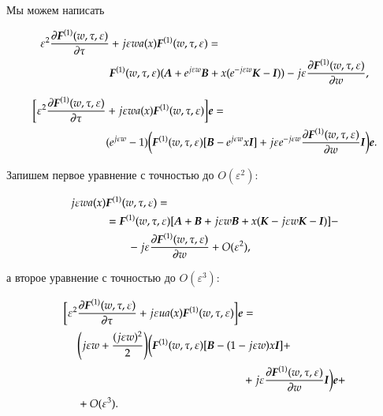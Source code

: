 Мы можем написать 

\begin{align*}
	\varepsilon ^2 \pdv{\boldsymbol{F}^{(1)}(w, \tau , \varepsilon)}{\tau} &+ j\varepsilon w a(x)\boldsymbol{F}^{(1)}(w, \tau , \varepsilon) =\\
	&\boldsymbol{F}^{(1)}(w, \tau , \varepsilon)(\boldsymbol{A}+e^{j\varepsilon w}\boldsymbol{B}+x(e^{-j \varepsilon w}\boldsymbol{K}- \boldsymbol{I}))
	-j\varepsilon \pdv{\boldsymbol{F}^{(1)}(w, \tau , \varepsilon)}{w}(e^{-j \varepsilon w}\boldsymbol{K}- \boldsymbol{I}),
\end{align*}

\begin{align*}
	\bigg[ \varepsilon ^2 \pdv{\boldsymbol{F}^{(1)}(w, \tau , \varepsilon)}{\tau} &+ j\varepsilon wa(x)\boldsymbol{F}^{(1)}(w, \tau , \varepsilon) \bigg]  \boldsymbol{e}=\\
	&(e^{j \varepsilon w}-1)\bigg(\boldsymbol{F}^{(1)}(w, \tau , \varepsilon)[\boldsymbol{B}-e^{j \varepsilon w}x\boldsymbol{I}]
	+j\varepsilon e^{-j\varepsilon w} \pdv{\boldsymbol{F}^{(1)}(w, \tau , \varepsilon)}{w}\boldsymbol{I}\bigg)\boldsymbol{e}.
\end{align*}

Запишем первое уравнение с точностью до $O(\varepsilon^2)$:

\begin{equation}\begin{aligned}\label{one_with_tochost}
		j\varepsilon wa(x) &\boldsymbol{F}^{(1)}(w, \tau , \varepsilon) = \\
		&=\boldsymbol{F}^{(1)}(w, \tau , \varepsilon)[\boldsymbol{A}+\boldsymbol{B}+j\varepsilon w\boldsymbol{B}+x(\boldsymbol{K} - j \varepsilon w\boldsymbol{K}- \boldsymbol{I})]-\\
		&\hspace{20pt}-j\varepsilon \pdv{\boldsymbol{F}^{(1)}(w, \tau , \varepsilon)}{w}(\boldsymbol{K}- \boldsymbol{I}) + O(\varepsilon ^2),
\end{aligned}\end{equation}

а второе уравнение с точностью до $O(\varepsilon^3)$:

\begin{equation}\begin{aligned}\label{two_with_tochost}
		\bigg[ \varepsilon ^2 &\pdv{\boldsymbol{F}^{(1)}(w, \tau , \varepsilon)}{\tau} 
            + j \varepsilon ua(x)\boldsymbol{F}^{(1)}(w, \tau , \varepsilon) \bigg]  
        \boldsymbol{e}= \\
        &\Bigg(j\varepsilon w  + \frac{(j\varepsilon w)^2}{2}\Bigg)\bigg( 
            \boldsymbol{F}^{(1)}(w, \tau , \varepsilon)[\boldsymbol{B}-(1-j \varepsilon w)x\boldsymbol{I}] + \\
            &\hspace{150pt}+j \varepsilon \pdv{\boldsymbol{F}^{(1)}(w, \tau , \varepsilon)}{w}\boldsymbol{I}\bigg)\boldsymbol{e}+ \\
        &+O(\varepsilon ^3).
\end{aligned}\end{equation}

